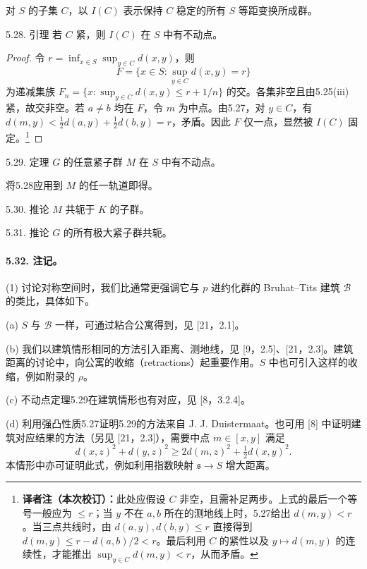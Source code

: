 对 $S$ 的子集 $C$，以 $I(C)$ 表示保持 $C$ 稳定的所有 $S$ 等距变换所成群。
\begin{originaltheorem}{5.28. 引理}
若 $C$ 紧，则 $I(C)$ 在 $S$ 中有不动点。
\end{originaltheorem}
\begin{proof}
令 $r=\inf_{x\in S}\sup_{y\in C}d(x,y)$，则
\[
 F=\{x\in S:\sup_{y\in C}d(x,y)=r\}
\]
为递减集族 $F_n=\{x:\sup_{y\in C}d(x,y)\le r+1/n\}$ 的交。各集非空且由5.25(iii)紧，故交非空。若 $a\ne b$ 均在 $F$，令 $m$ 为中点。由5.27，对 $y\in C$，有 $d(m,y)<\tfrac12d(a,y)+\tfrac12d(b,y)=r$，矛盾。因此 $F$ 仅一点，显然被 $I(C)$ 固定。\footnote{\textbf{译者注（本次校订）：}此处应假设 $C$ 非空，且需补足两步。上式的最后一个等号一般应为 $\le r$；当 $y$ 不在 $a,b$ 所在的测地线上时，5.27给出 $d(m,y)<r$。当三点共线时，由 $d(a,y),d(b,y)\le r$ 直接得到 $d(m,y)\le r-d(a,b)/2<r$。最后利用 $C$ 的紧性以及 $y\mapsto d(m,y)$ 的连续性，才能推出 $\sup_{y\in C}d(m,y)<r$，从而矛盾。}
\end{proof}
\begin{originaltheorem}{5.29. 定理}
$G$ 的任意紧子群 $M$ 在 $S$ 中有不动点。
\end{originaltheorem}
将5.28应用到 $M$ 的任一轨道即得。
\begin{originaltheorem}{5.30. 推论}
$M$ 共轭于 $K$ 的子群。
\end{originaltheorem}
\begin{originaltheorem}{5.31. 推论}
$G$ 的所有极大紧子群共轭。
\end{originaltheorem}
\paragraph*{5.32. 注记。} (1) 讨论对称空间时，我们比通常更强调它与 $p$ 进约化群的 Bruhat--Tits 建筑 $\mathcal B$ 的类比，具体如下。

(a) $S$ 与 $\mathcal B$ 一样，可通过粘合公寓得到，见 [21，2.1]。

(b) 我们以建筑情形相同的方法引入距离、测地线，见 [9，2.5]、[21，2.3]。建筑距离的讨论中，向公寓的收缩（retractions）起重要作用。$S$ 中也可引入这样的收缩，例如附录的 $\rho$。

(c) 不动点定理5.29在建筑情形也有对应，见 [8，3.2.4]。

(d) 利用强凸性质5.27证明5.29的方法来自 J. J. Duistermaat。也可用 [8] 中证明建筑对应结果的方法（另见 [21，2.3]），需要中点 $m\in[x,y]$ 满足
\[
 d(x,z)^2+d(y,z)^2\ge2d(m,z)^2+\tfrac12d(x,y)^2.
\]
本情形中亦可证明此式，例如利用指数映射 $\mathfrak s\to S$ 增大距离。

